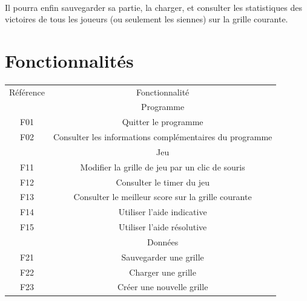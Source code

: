         \paragraph*{}
        Il pourra enfin sauvegarder sa partie, la charger, et consulter les statistiques des victoires de tous les joueurs (ou seulement les siennes) sur la grille courante.




\section{Fonctionnalités}
        \paragraph*{}
        \begin{tabular*}{0.75\textwidth}{ c | c }
                Référence & Fonctionnalité\\
                & Programme \\ 
                F01 & Quitter le programme \\
                F02 & Consulter les informations complémentaires du programme \\
                & Jeu \\ 
                F11 & Modifier la grille de jeu par un clic de souris \\
                F12 & Consulter le timer du jeu \\
                F13 & Consulter le meilleur score sur la grille courante \\
                F14 & Utiliser l'aide indicative \\
                F15 & Utiliser l'aide résolutive \\
                & Données \\ 
                F21 & Sauvegarder une grille \\
                F22 & Charger une grille \\
                F23 & Créer une nouvelle grille \\ %
        \end{tabular*}


